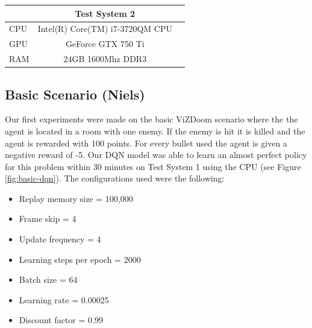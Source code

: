 \documentclass{article}
\begin{document}
\begin{center}
  \begin{tabular}{ | l | c | r | }
    \hline
      & Test System 2 \\ \hline
    CPU & Intel(R) Core(TM) i7-3720QM CPU  \\ \hline 
    GPU & GeForce GTX 750 Ti \\ \hline
    RAM & 24GB 1600Mhz DDR3\\ \hline
  \end{tabular}
\end{center}


\subsection{Basic Scenario (Niels)}
\label{sec:basic_scenario}
Our first experiments were made on the basic ViZDoom scenario where the the agent is located in a room with one enemy. If the enemy is hit it is killed and the agent is rewarded with 100 points. For every bullet used the agent is given a negative reward of -5. Our DQN model was able to learn an almost perfect policy for this problem within 30 minutes on Test System 1 using the CPU (see Figure \ref{fig:basic-dqn}). The configurations used were the following:

\begin{itemize}[noitemsep]
\item Replay memory size = 100,000
\item Frame skip = 4
\item Update frequency = 4
\item Learning steps per epoch = 2000
\item Batch size = 64
\item Learning rate = 0.00025
\item Discount factor = 0.99
\end{itemize}
\end{document}
